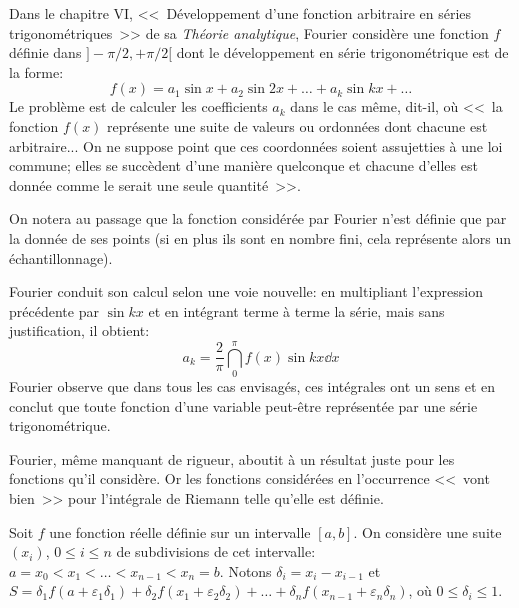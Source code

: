 \medskip
\begin{histoire}%
Dans le chapitre VI, <<~Développement d'une fonction arbitraire en séries
trigonométriques~>> de sa \emph{Théorie analytique}, Fourier
considère une fonction $f$
définie dans $]-\pi/2,+\pi/2[$ dont le développement en série trigonométrique est
de la forme:
\begin{equation} f(x)=a_1\sin x+a_2\sin 2x +\ldots+a_k\sin kx +\ldots\end{equation}
Le problème est de calculer les coefficients $a_k$ dans le cas même, dit-il, où <<~la
fonction $f(x)$ représente une suite de valeurs ou ordonnées dont chacune est
arbitraire... On ne suppose point que ces coordonnées soient assujetties à une
loi commune; elles se succèdent d'une manière quelconque et chacune d'elles
est donnée comme le serait une seule quantité~>>.

On notera au passage que la fonction considérée par Fourier
n'est définie que par la donnée de ses points (si en plus ils sont en nombre fini, cela représente alors
un échantillonnage).

\medskip
Fourier
conduit son calcul selon une voie nouvelle: en multipliant l'expression précédente
par $\sin kx$ et en intégrant terme à terme la série, mais sans justification, il obtient:
\begin{equation}a_k=\frac2{\pi}\dint_0^{\pi} f(x)\sin kx \dd x\end{equation}
Fourier
observe que dans tous les cas envisagés, ces intégrales ont un sens et en conclut
que toute fonction d'une variable peut-être représentée par une série trigonométrique.

Fourier,
même manquant de rigueur, aboutit à un résultat juste pour les fonctions
qu'il considère.
Or les fonctions considérées en l'occurrence <<~vont bien~>> pour l'intégrale de Riemann
telle qu'elle est définie.

\medskip
\begin{definition}
Soit $f$ une fonction réelle définie sur un intervalle $[a,b]$.
On considère une suite $(x_i)$, $0\le i\le n$ de subdivisions de cet intervalle:
$a=x_0 < x_1 <\ldots < x_{n-1} <x_n=b$.
Notons $\delta_i=x_i-x_{i-1}$ et $S=\delta_1f(a+\varepsilon_1\delta_1) +
\delta_2 f(x_1+\varepsilon_2\delta_2)+ \ldots + \delta_nf(x_{n-1}+\varepsilon_n\delta_n)$,
où $0\le \delta_i\le 1$.


\end{definition}
\end{histoire}
